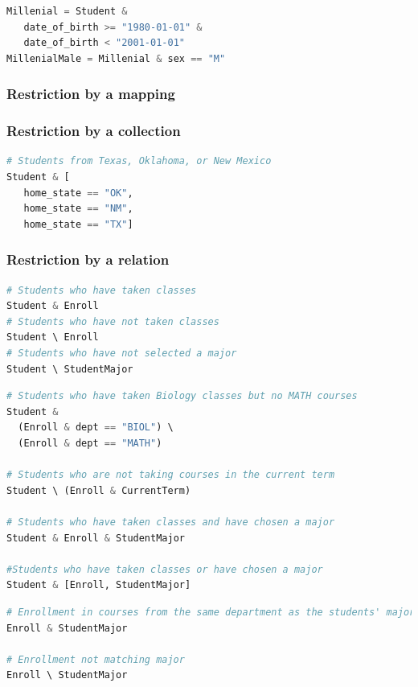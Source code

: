 \documentclass[letter,10pt]{article}
\begin{document}
\begin{lstlisting}[language=Python, caption={Assignment and use of relational variables.}, label={lst:res2}]
Millenial = Student & 
   date_of_birth >= "1980-01-01" & 
   date_of_birth < "2001-01-01"
MillenialMale = Millenial & sex == "M"
\end{lstlisting}

\subsubsection{Restriction by a mapping}

\subsubsection{Restriction by a collection}
\begin{lstlisting}[language=Python, caption={Restrictions by a collection of conditions.}, label={lst:res4}]
# Students from Texas, Oklahoma, or New Mexico
Student & [
   home_state == "OK", 
   home_state == "NM", 
   home_state == "TX"] 
\end{lstlisting}


\subsubsection{Restriction by a relation}
\begin{lstlisting}[language=Python, caption={Restrictions by another entity.}, label={lst:res5}]
# Students who have taken classes
Student & Enroll
# Students who have not taken classes
Student \ Enroll
# Students who have not selected a major
Student \ StudentMajor
\end{lstlisting}

\begin{lstlisting}[language=Python, caption={Composite restrictions.}, label={lst:res6}]
# Students who have taken Biology classes but no MATH courses
Student & 
  (Enroll & dept == "BIOL") \ 
  (Enroll & dept == "MATH")

# Students who are not taking courses in the current term
Student \ (Enroll & CurrentTerm)

# Students who have taken classes and have chosen a major
Student & Enroll & StudentMajor 

#Students who have taken classes or have chosen a major
Student & [Enroll, StudentMajor]
\end{lstlisting}

\begin{lstlisting}[language=Python, caption={Avoiding unintended restrictions.}, label={lst:res7}]
# Enrollment in courses from the same department as the students' major
Enroll & StudentMajor

# Enrollment not matching major 
Enroll \ StudentMajor 
\end{lstlisting}
\end{document}
